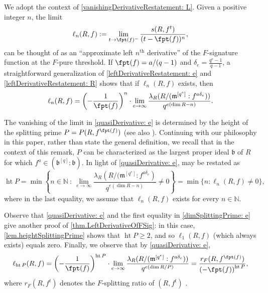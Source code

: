 \documentclass[11pt]{amsart}
\begin{document}
\begin{remark}
\label{CantonRemark: R}
We adopt the context of \autoref{vanishingDerivativeRestatement: L}.  Given a positive integer $n$, the limit
\[ \ell_n(R,f) := \lim_{t \to \fpt(f)^-} \frac{s(R, f^{t})}{(t - \fpt(f))^n},\]
can be thought of as an ``approximate left $n^{\text{th}}$ derivative'' of the $F$-signature function at the $F$-pure threshold.  If $\fpt(f) = a/(q-1)$ and $\delta_e = \frac{q^e-1}{q-1}$, a straightforward generalization of \eqref{leftDerivativeRestatement: e} and \autoref{leftDerivativeRestatement: R} shows that if $\ell_n(R,f)$ exists, then
\begin{equation}
\label{quasiDerivative: e}
 \ell_n(R,f) = \left(- \frac{1}{\fpt(f)} \right)^n \cdot \lim_{e \to \infty} \frac{ \lambda_R (R/ ({\mathfrak{m}}^{[q^e]} : f^{a \delta_e}))}{q^{e(\dim R - n)}}.
 \end{equation}

The vanishing of the limit in \eqref{quasiDerivative: e} is determined by the height of the splitting prime $P = P(R, f^{\fpt(f)})$  \cite[Proposition 2.12]{BlickleSchwedeTuckerFSigPairs1} (see also \cite[Definition 3.2]{AberbachEnescuStructureOfFPure}).  Continuing with our philosophy in this paper, rather than state the general definition, we recall that in the context of this remark, $P$ can be characterized as the largest proper ideal ${\mathfrak{b}}$ of $R$ for which $f^a \in ( {\mathfrak{b}}^{[q]} : {\mathfrak{b}})$.  In light of \eqref{quasiDerivative: e},  \cite[Definition 4.5]{BlickleSchwedeTuckerFSigPairs1} may be restated as
 \begin{equation}
 \label{dimSplittingPrime: e}
\operatorname{ht} P = \min \left\{ n \in \mathbb{N} \ : \ \lim_{e \to \infty} \frac{\lambda_R\left( R/ ({\mathfrak{m}}^{[q^e]} : f^{ a \delta_e }  \right) }{q^{e(\dim R - n)}} \neq 0 \right\} = \min \{ n : \ell_n(R,f) \neq 0 \},
\end{equation}
where in the last equality, we assume that $\ell_n(R,f)$ exists for every $n \in \mathbb{N}$.

Observe that \eqref{quasiDerivative: e} and the first equality in \eqref{dimSplittingPrime: e}  give another proof of \autoref{thm.LeftDerivativeOfFSig}:  in this case, \autoref{lem.heightSplittingPrime} shows that $\operatorname{ht} P \geq 2$, and so $\ell_1(R,f)$ (which always exists) equals zero.  Finally, we observe that by \eqref{quasiDerivative: e}, \[ \ell_{\operatorname{ht} P}(R,f) =  \left(- \frac{1}{\fpt(f)} \right)^{\operatorname{ht} P} \cdot \lim_{e \to \infty} \frac{ \lambda_R (R/ ({\mathfrak{m}}^{[q^e]} : f^{a \delta_e}))}{q^{e(\dim R/P)}} = \frac{r_F(R, f^{\fpt(f)})}{\left( - \fpt(f) \right)^{\operatorname{ht} P}}, \]
where $r_F(R, f^t)$ denotes the {$F$-splitting ratio} of $(R, f^t)$ \cite{AberbachEnescuStructureOfFPure, BlickleSchwedeTuckerFSigPairs1}.
\end{remark}
\end{document}
